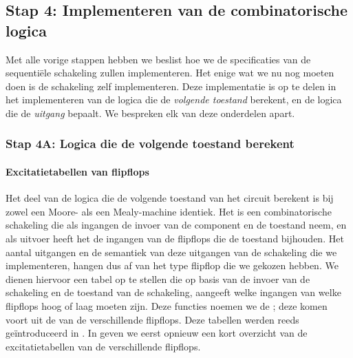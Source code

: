 \subsection{Stap 4: Implementeren van de combinatorische logica}
Met alle vorige stappen hebben we beslist hoe we de specificaties van de sequenti\"ele schakeling zullen implementeren. Het enige wat we nu nog moeten doen is de schakeling zelf implementeren. Deze implementatie is op te delen in het implementeren van de logica die de \emph{volgende toestand} berekent, en de logica die de \emph{uitgang} bepaalt. We bespreken elk van deze onderdelen apart.

\subsubsection{Stap 4A: Logica die de volgende toestand berekent}

\paragraph{Excitatietabellen van flipflops}
Het deel van de logica die de volgende toestand van het circuit berekent is bij zowel een Moore- als een Mealy-machine identiek. Het is een combinatorische schakeling die als ingangen de invoer van de component en de toestand neem, en als uitvoer heeft het de ingangen van de flipflops die de toestand bijhouden. Het aantal uitgangen en de semantiek van deze uitgangen van de schakeling die we implementeren, hangen dus af van het type flipflop die we gekozen hebben. We dienen hiervoor een tabel op te stellen die op basis van de invoer van de schakeling en de toestand van de schakeling, aangeeft welke ingangen van welke flipflops hoog of laag moeten zijn. Deze functies noemen we de ; deze komen voort uit de  van de verschillende flipflops. Deze tabellen werden reeds ge\"introduceerd in . In  geven we eerst opnieuw een kort overzicht van de excitatietabellen van de verschillende flipflops.

